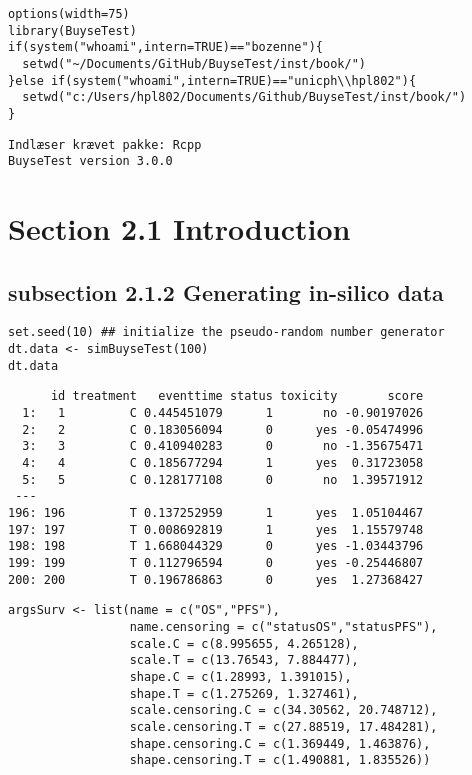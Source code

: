 \documentclass[12pt]{article}
\date{\today}
\title{}
\begin{document}
\lstset{language=r,label= ,caption= ,captionpos=b,numbers=none}
\begin{lstlisting}
options(width=75)
library(BuyseTest)
if(system("whoami",intern=TRUE)=="bozenne"){
  setwd("~/Documents/GitHub/BuyseTest/inst/book/")
}else if(system("whoami",intern=TRUE)=="unicph\\hpl802"){
  setwd("c:/Users/hpl802/Documents/Github/BuyseTest/inst/book/")
}
\end{lstlisting}

\begin{verbatim}
Indlæser krævet pakke: Rcpp
BuyseTest version 3.0.0
\end{verbatim}

\section{Section 2.1 Introduction}
\label{sec:orgf9756ef}
\subsection{subsection 2.1.2 Generating in-silico data}
\label{sec:org900aea0}
\lstset{language=r,label= ,caption= ,captionpos=b,numbers=none}
\begin{lstlisting}
set.seed(10) ## initialize the pseudo-random number generator 
dt.data <- simBuyseTest(100)
dt.data
\end{lstlisting}

\begin{verbatim}
      id treatment   eventtime status toxicity       score
  1:   1         C 0.445451079      1       no -0.90197026
  2:   2         C 0.183056094      0      yes -0.05474996
  3:   3         C 0.410940283      0       no -1.35675471
  4:   4         C 0.185677294      1      yes  0.31723058
  5:   5         C 0.128177108      0       no  1.39571912
 ---                                                      
196: 196         T 0.137252959      1      yes  1.05104467
197: 197         T 0.008692819      1      yes  1.15579748
198: 198         T 1.668044329      0      yes -1.03443796
199: 199         T 0.112796594      0      yes -0.25446807
200: 200         T 0.196786863      0      yes  1.27368427
\end{verbatim}

\lstset{language=r,label= ,caption= ,captionpos=b,numbers=none}
\begin{lstlisting}
argsSurv <- list(name = c("OS","PFS"),
                 name.censoring = c("statusOS","statusPFS"),
                 scale.C = c(8.995655, 4.265128),
                 scale.T = c(13.76543, 7.884477),
                 shape.C = c(1.28993, 1.391015),
                 shape.T = c(1.275269, 1.327461),
                 scale.censoring.C = c(34.30562, 20.748712),
                 scale.censoring.T = c(27.88519, 17.484281),
                 shape.censoring.C = c(1.369449, 1.463876),
                 shape.censoring.T = c(1.490881, 1.835526))
\end{lstlisting}
\end{document}

